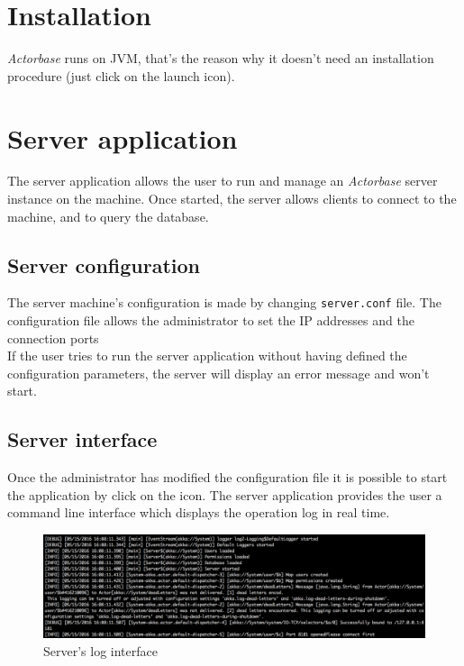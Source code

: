 \documentclass[a4paper]{article}
\begin{document}
	\section{Installation}
	\emph{Actorbase} runs on JVM, that's the reason why it doesn't need an installation procedure (just click on the launch icon). 
	\newpage



	\section{Server application}
	The server application allows the user to run and manage an \emph{Actorbase} server instance on the machine. Once started, the server allows clients to connect to the machine, and to query the database.
	
	\subsection{Server configuration}
	The server machine's configuration is made by changing \texttt{server.conf} file. The configuration file allows the administrator to set the IP addresses and the connection ports
	\\
	If the user tries to run the server application without having defined the configuration parameters, the server will display an error message and won't start.
	
	\subsection{Server interface}
	Once the administrator has modified the configuration file it is possible to start the application by click on the icon. The server application provides the user a command line interface which displays the operation log in real time.
	\begin{figure}[H]
		\centering
		\includegraphics[width=\textwidth]{logServer.png}
		\caption{Server's log interface}
	\end{figure}
	\newpage
	
\end{document}
